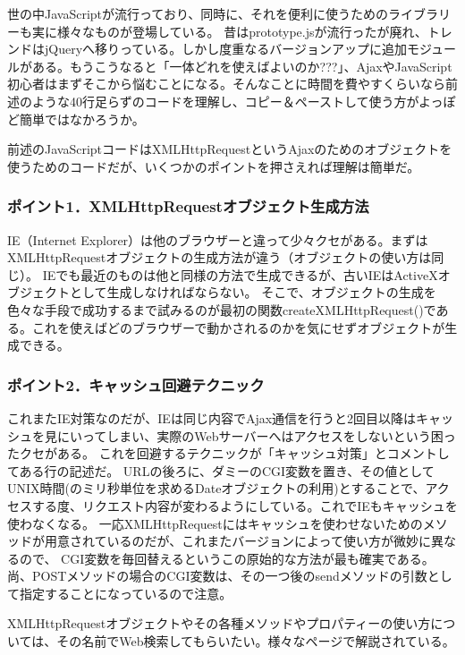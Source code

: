 世の中JavaScriptが流行っており、同時に、それを便利に使うためのライブラリーも実に様々なものが登場している。
昔はprototype.jsが流行ったが廃れ、トレンドはjQueryへ移りっている。しかし度重なるバージョンアップに追加モジュールがある。もうこうなると「一体どれを使えばよいのか???」、AjaxやJavaScript初心者はまずそこから悩むことになる。そんなことに時間を費やすくらいなら前述のような40行足らずのコードを理解し、コピー＆ペーストして使う方がよっぽど簡単ではなかろうか。

前述のJavaScriptコードはXMLHttpRequestというAjaxのためのオブジェクトを使うためのコードだが、いくつかのポイントを押さえれば理解は簡単だ。

\subsubsection*{ポイント1．XMLHttpRequestオブジェクト生成方法}

IE（Internet Explorer）は他のブラウザーと違って少々クセがある。まずはXMLHttpRequestオブジェクトの生成方法が違う（オブジェクトの使い方は同じ）。
IEでも最近のものは他と同様の方法で生成できるが、古いIEはActiveXオブジェクトとして生成しなければならない。
そこで、オブジェクトの生成を色々な手段で成功するまで試みるのが最初の関数createXMLHttpRequest()である。これを使えばどのブラウザーで動かされるのかを気にせずオブジェクトが生成できる。

\subsubsection*{ポイント2．キャッシュ回避テクニック}

これまたIE対策なのだが、IEは同じ内容でAjax通信を行うと2回目以降はキャッシュを見にいってしまい、実際のWebサーバーへはアクセスをしないという困ったクセがある。
これを回避するテクニックが「キャッシュ対策」とコメントしてある行の記述だ。
URLの後ろに、ダミーのCGI変数を置き、その値としてUNIX時間(のミリ秒単位を求めるDateオブジェクトの利用)とすることで、アクセスする度、リクエスト内容が変わるようにしている。これでIEもキャッシュを使わなくなる。
一応XMLHttpRequestにはキャッシュを使わせないためのメソッドが用意されているのだが、これまたバージョンによって使い方が微妙に異なるので、
CGI変数を毎回替えるというこの原始的な方法が最も確実である。尚、POSTメソッドの場合のCGI変数は、その一つ後のsendメソッドの引数として指定することになっているので注意。

XMLHttpRequestオブジェクトやその各種メソッドやプロパティーの使い方については、その名前でWeb検索してもらいたい。様々なページで解説されている。


